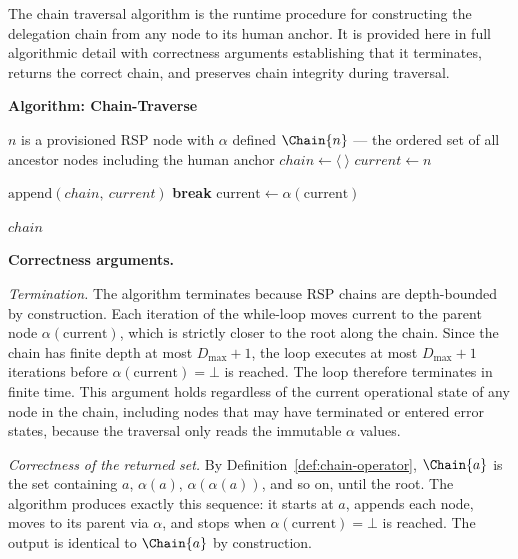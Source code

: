 The chain traversal algorithm is the runtime procedure for constructing the delegation chain from any node to its human anchor. It is provided here in full algorithmic detail with correctness arguments establishing that it terminates, returns the correct chain, and preserves chain integrity during traversal.

\bigskip
\noindent\textbf{Algorithm: Chain-Traverse}
\begin{algorithm}
\caption{Chain-Traverse($n$) --- Build the delegation chain from node $n$ to the human anchor}
\label{alg:chain-traverse}
\begin{algorithmic}[1]
\REQUIRE $n$ is a provisioned RSP node with $\alpha$ defined
\ENSURE $\Chain{n}$ --- the ordered set of all ancestor nodes including the human anchor
\STATE $chain \leftarrow \langle \ \rangle$ 
\STATE $current \leftarrow n$ 

    \STATE $\text{append}(chain,\ current)$ 
        \STATE \textbf{break} 
    \ENDIF
    \STATE $\text{current} \leftarrow \alpha(\text{current})$ 
\ENDWHILE

\RETURN $chain$
\end{algorithmic}
\end{algorithm}

\bigskip
\noindent\textbf{Correctness arguments.}

\textit{Termination.} The algorithm terminates because RSP chains are depth-bounded by construction. Each iteration of the while-loop moves $\text{current}$ to the parent node $\alpha(\text{current})$, which is strictly closer to the root along the chain. Since the chain has finite depth at most $D_{\max} + 1$, the loop executes at most $D_{\max} + 1$ iterations before $\alpha(\text{current}) = \bot$ is reached. The loop therefore terminates in finite time. This argument holds regardless of the current operational state of any node in the chain, including nodes that may have terminated or entered error states, because the traversal only reads the immutable $\alpha$ values.

\textit{Correctness of the returned set.} By Definition~\ref{def:chain-operator}, $\Chain{a}$ is the set containing $a$, $\alpha(a)$, $\alpha(\alpha(a))$, and so on, until the root. The algorithm produces exactly this sequence: it starts at $a$, appends each node, moves to its parent via $\alpha$, and stops when $\alpha(\text{current}) = \bot$ is reached. The output is identical to $\Chain{a}$ by construction.

